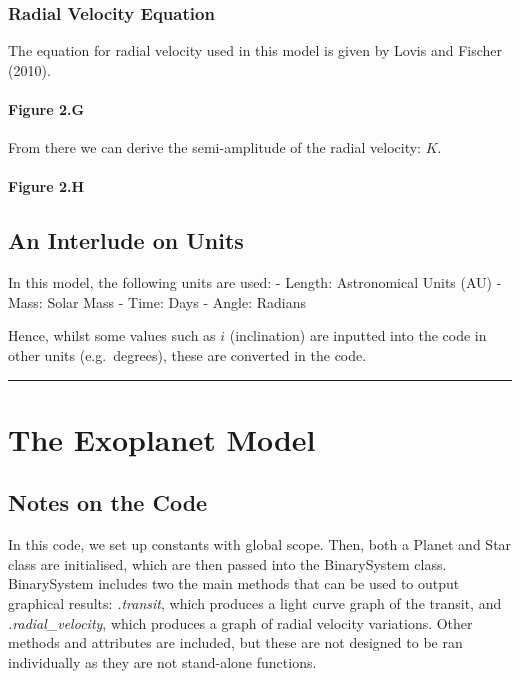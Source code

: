 \documentclass[11pt]{article}
\begin{document}
\hypertarget{radial-velocity-equation}{%
\subsubsection{Radial Velocity Equation}\label{radial-velocity-equation}}

The equation for radial velocity used in this model is given by Lovis
and Fischer (2010).

    \hypertarget{figure-2.g}{%
\paragraph{Figure 2.G}\label{figure-2.g}}

    From there we can derive the semi-amplitude of the radial velocity:
\(K\).

    \hypertarget{figure-2.h}{%
\paragraph{Figure 2.H}\label{figure-2.h}}

    \hypertarget{an-interlude-on-units}{%
\subsection{An Interlude on Units}\label{an-interlude-on-units}}

In this model, the following units are used: - Length: Astronomical
Units (AU) - Mass: Solar Mass - Time: Days - Angle: Radians

Hence, whilst some values such as \(i\) (inclination) are inputted into
the code in other units (e.g.~degrees), these are converted in the code.\\

\pagebreak
\begin{center}\rule{0.5\linewidth}{0.5pt}\end{center}
    \hypertarget{the-exoplanet-model}{%
\section{The Exoplanet Model}\label{the-exoplanet-model}}

\hypertarget{notes-on-the-code}{%
\subsection{Notes on the Code}\label{notes-on-the-code}}

In this code, we set up constants with global scope. Then, both a Planet
and Star class are initialised, which are then passed into the
BinarySystem class. BinarySystem includes two the main methods that can
be used to output graphical results: \emph{.transit}, which produces a
light curve graph of the transit, and \emph{.radial\_velocity}, which
produces a graph of radial velocity variations. Other methods and
attributes are included, but these are not designed to be ran
individually as they are not stand-alone functions.
\end{document}
